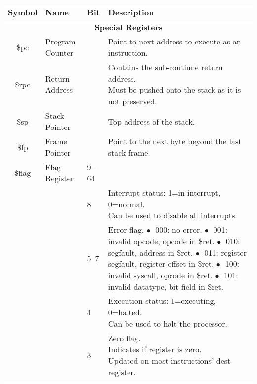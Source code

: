 \documentclass[10pt]{article}
\begin{document}
    \bigskip
    \begin{longtable}{|c|l|l|l|}
        \hline
        \textbf{Symbol} & \textbf{Name} & \textbf{Bit} & \textbf{Description} \\
        \hline
        \multicolumn{4}{|c|}{\textbf{Special Registers}} \\
        \hline
        \$pc & Program Counter &  & Point to next address to execute as an instruction. \\
        \hline
        \$rpc & Return Address &  & \makecell[l]{Contains the sub-routiune return address.\\%
        Must be pushed onto the stack as it is not preserved.} \\
        \hline
        \$sp & Stack Pointer &  & Top address of the stack. \\
        \hline
        \$fp & Frame Pointer &  & Point to the next byte beyond the last stack frame. \\
        \hline
        \$flag & Flag Register & 9--64 & \\
        \cline{3-4}
        & & 8 & \makecell[l]{Interrupt status: 1=in interrupt, 0=normal.\\%
        Can be used to disable all interrupts.} \\
        \cline{3-4}
        & & 5--7 & \makecell[l]{Error flag.\\%
        \(\bullet\;\) 000: no error.\\%
        \(\bullet\;\) 001: invalid opcode, opcode in \$ret.\\%
        \(\bullet\;\) 010: segfault, address in \$ret.\\%
        \(\bullet\;\) 011: register segfault, register offset in \$ret.\\%
        \(\bullet\;\) 100: invalid syscall, opcode in \$ret.\\%
        \(\bullet\;\) 101: invalid datatype, bit field in \$ret.\\%
        } \\
        \cline{3-4}
        & & 4 & \makecell[l]{Execution status: 1=executing, 0=halted.\\%
        Can be used to halt the processor.} \\
        \cline{3-4}
        & & 3 & \makecell[l]{Zero flag.\\%
        Indicates if register is zero.\\%
        Updated on most instructions' dest register.} \\
        \cline{3-4}

\end{longtable}
\end{document}
